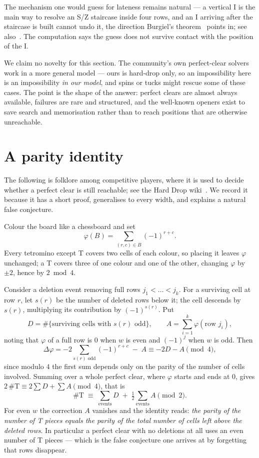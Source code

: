 \documentclass[11pt,a4paper]{article}
\theoremstyle{plain}
\theoremstyle{definition}
\theoremstyle{remark}
\newcommand{\board}{B}
\begin{document}
The mechanism one would guess for lateness remains natural --- a vertical I is the main
way to resolve an S/Z staircase inside four rows, and an I arriving after the staircase
is built cannot undo it, the direction Burgiel's theorem~\cite{burgiel1997} points in;
see also~\cite{brzustowski1992}. The computation says the guess does not survive
contact with the position of the I.

We claim no novelty for this section. The community's own perfect-clear solvers work
in a more general model --- ours is hard-drop only, so an impossibility here is an
impossibility \emph{in our model}, and spins or tucks might rescue some of these
cases. The point is the shape of the answer: perfect clears are almost always
available, failures are rare and structured, and the well-known openers exist to save
search and memorisation rather than to reach positions that are otherwise
unreachable.

\appendix

\section{A parity identity}
\label{app:parity}

The following is folklore among competitive players, where it is used to decide
whether a perfect clear is still reachable; see the Hard Drop wiki~\cite{harddropparity}.
We record it because it has a short proof, generalises to every width, and explains
a natural false conjecture.

Colour the board like a chessboard and set
\[
\varphi(\board) = \sum_{(r,c) \in \board} (-1)^{r+c}.
\]
Every tetromino except T covers two cells of each colour, so placing it leaves
$\varphi$ unchanged; a T covers three of one colour and one of the other, changing
$\varphi$ by $\pm 2$, hence by $2 \bmod 4$.

Consider a deletion event removing full rows $j_1 < \dots < j_k$. For a surviving
cell at row $r$, let $s(r)$ be the number of deleted rows below it; the cell descends
by $s(r)$, multiplying its contribution by $(-1)^{s(r)}$. Put
\[
D = \#\{\text{surviving cells with } s(r) \text{ odd}\},
\qquad
A = \sum_{i=1}^{k} \varphi(\text{row } j_i),
\]
noting that $\varphi$ of a full row is $0$ when $w$ is even and $(-1)^{j}$ when $w$
is odd. Then
\[
\Delta\varphi = -2\!\!\sum_{s(r) \text{ odd}}\!\!(-1)^{r+c} \; - \; A
\equiv -2D - A \pmod 4,
\]
since modulo $4$ the first sum depends only on the parity of the number of cells
involved. Summing over a whole perfect clear, where $\varphi$ starts and ends at $0$,
gives $2\,\#\mathrm{T} \equiv 2\sum D + \sum A \pmod 4$, that is
\[
\#\mathrm{T} \;\equiv\; \sum_{\text{events}} D \;+\; \tfrac{1}{2}\sum_{\text{events}} A
\pmod 2 .
\]
For even $w$ the correction $A$ vanishes and the identity reads: \emph{the parity of
the number of T pieces equals the parity of the total number of cells left above the
deleted rows}. In particular a perfect clear with no deletions at all uses an even
number of T pieces --- which is the false conjecture one arrives at by forgetting
that rows disappear.
\end{document}
